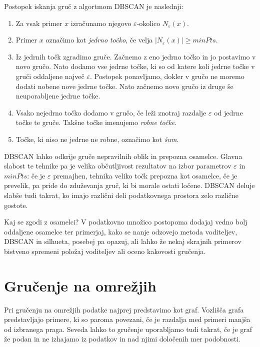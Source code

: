 Postopek iskanja gruč z algortmom DBSCAN je naslednji:
\begin{enumerate}
\item Za vsak primer $x$ izračunamo njegovo $\varepsilon$-okolico $N_\varepsilon(x)$.
\item Primer $x$ označimo kot {\em jedrno točko}, če velja $|N_\varepsilon(x)| \ge minPts$.
\item Iz jedrnih točk zgradimo gruče. Začnemo z eno jedrno točko in jo postavimo v novo gručo. Nato dodamo vse jedrne točke, ki so od katere koli jedrne točke v gruči oddaljene največ $\varepsilon$. Postopek ponavljamo, dokler v gručo ne moremo dodati nobene nove jedrne točke. Nato začnemo novo gručo iz druge še neuporabljene jedrne točke.
\item Vsako nejedrno točko dodamo v gručo, če leži znotraj razdalje $\varepsilon$ od jedrne točke te gruče. Takšne točke imenujemo {\em robne točke}.
\item Točke, ki niso ne jedrne ne robne, označimo kot {\em šum}.
\end{enumerate}

DBSCAN lahko odkrije gruče nepravilnih oblik in prepozna osamelce. Glavna slabost te tehnike pa je velika občutljivost rezultatov na izbor parametrov $\varepsilon$ in $minPts$: če je $\varepsilon$ premajhen, tehnika veliko točk prepozna kot osamelce, če je prevelik, pa pride do zduževanja gruč, ki bi morale ostati ločene. DBSCAN deluje slabše tudi takrat, ko imajo različni deli podatkovnega prostora zelo različne gostote.

\begin{exercise}{Kaj se zgodi z osamelci?}
V podatkovno množico postopoma dodajaj vedno bolj oddaljene osamelce ter primerjaj, kako se nanje odzovejo metoda voditeljev, DBSCAN in silhueta, posebej pa opazuj, ali lahko že nekaj skrajnih primerov bistveno spremeni položaj voditeljev ali oceno kakovosti gručenja.
\end{exercise}

\section{Gručenje na omrežjih}

Pri gručenju na omrežjih podatke najprej predstavimo kot graf. Vozlišča
grafa predstavljajo primere, ki so paroma povezani, če je razdalja med primeri manjša od izbranega praga. Seveda lahko to gručenje uporabljamo tudi takrat, če je graf že podan in ne izhajamo iz podatkov in nad njimi določenih mer podobnosti.

